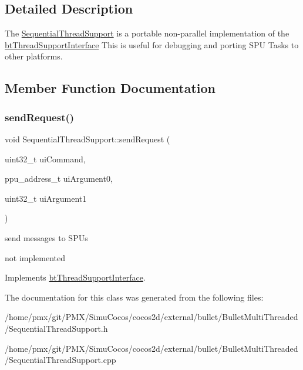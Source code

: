 \subsection{Detailed Description}
The \hyperlink{classSequentialThreadSupport}{Sequential\+Thread\+Support} is a portable non-\/parallel implementation of the \hyperlink{classbtThreadSupportInterface}{bt\+Thread\+Support\+Interface} This is useful for debugging and porting S\+PU Tasks to other platforms. 

\subsection{Member Function Documentation}
\mbox{\label{classSequentialThreadSupport_ab407174572a6ffe7c00fdbf096dd4f29}} 
\subsubsection{\texorpdfstring{send\+Request()}{sendRequest()}}
{\footnotesize\ttfamily void Sequential\+Thread\+Support\+::send\+Request (\begin{DoxyParamCaption}\item[{uint32\+\_\+t}]{ui\+Command,  }\item[{ppu\+\_\+address\+\_\+t}]{ui\+Argument0,  }\item[{uint32\+\_\+t}]{ui\+Argument1 }\end{DoxyParamCaption})\hspace{0.3cm}{\ttfamily [virtual]}}



send messages to S\+P\+Us 

not implemented 

Implements \hyperlink{classbtThreadSupportInterface_a2c20a0b41be978c429e0b1a2b2f03152}{bt\+Thread\+Support\+Interface}.



The documentation for this class was generated from the following files\+:\begin{DoxyCompactItemize}
\item 
/home/pmx/git/\+P\+M\+X/\+Simu\+Cocos/cocos2d/external/bullet/\+Bullet\+Multi\+Threaded/Sequential\+Thread\+Support.\+h\item 
/home/pmx/git/\+P\+M\+X/\+Simu\+Cocos/cocos2d/external/bullet/\+Bullet\+Multi\+Threaded/Sequential\+Thread\+Support.\+cpp\end{DoxyCompactItemize}

